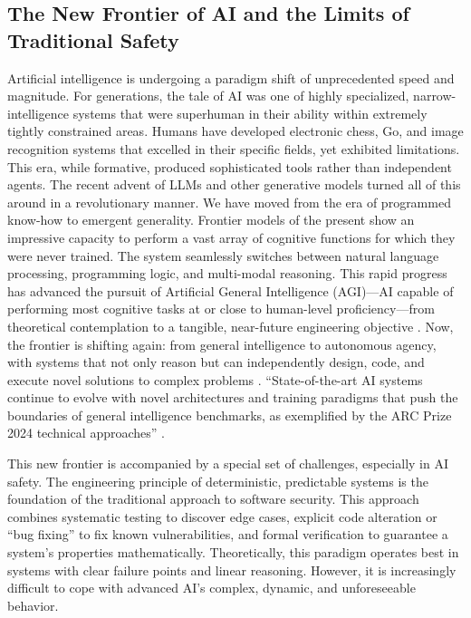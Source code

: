 \documentclass{article}
\begin{document}
\subsection{The New Frontier of AI and the Limits of Traditional Safety}
Artificial intelligence is undergoing a paradigm shift of unprecedented speed and magnitude. For generations, the tale of AI was one of highly specialized, narrow-intelligence systems that were superhuman in their ability within extremely tightly constrained areas. Humans have developed electronic chess, Go, and image recognition systems that excelled in their specific fields, yet exhibited limitations. This era, while formative, produced sophisticated tools rather than independent agents. The recent advent of LLMs and other generative models turned all of this around in a revolutionary manner. We have moved from the era of programmed know-how to emergent generality. Frontier models of the present show an impressive capacity to perform a vast array of cognitive functions for which they were never trained. The system seamlessly switches between natural language processing, programming logic, and multi-modal reasoning. This rapid progress has advanced the pursuit of Artificial General Intelligence (AGI)—AI capable of performing most cognitive tasks at or close to human-level proficiency—from theoretical contemplation to a tangible, near-future engineering objective \citep{ref13}. Now, the frontier is shifting again: from general intelligence to autonomous agency, with systems that not only reason but can independently design, code, and execute novel solutions to complex problems \citep{ref36}. “State-of-the-art AI systems continue to evolve with novel architectures and training paradigms that push the boundaries of general intelligence benchmarks, as exemplified by the ARC Prize 2024 technical approaches” \citep{ref6}.

This new frontier is accompanied by a special set of challenges, especially in AI safety. The engineering principle of deterministic, predictable systems is the foundation of the traditional approach to software security. This approach combines systematic testing to discover edge cases, explicit code alteration or “bug fixing” to fix known vulnerabilities, and formal verification to guarantee a system's properties mathematically. Theoretically, this paradigm operates best in systems with clear failure points and linear reasoning. However, it is increasingly difficult to cope with advanced AI's complex, dynamic, and unforeseeable behavior.
\end{document}
